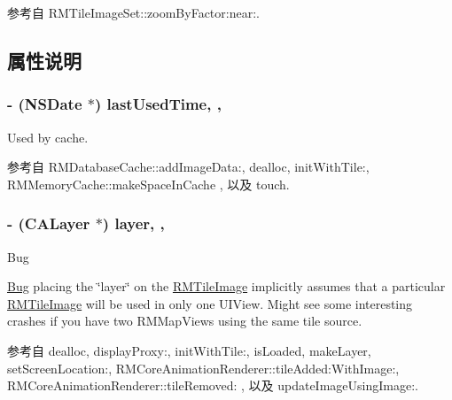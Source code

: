 参考自 R\-M\-Tile\-Image\-Set\-::zoom\-By\-Factor\-:near\-:.



\subsection{属性说明}
\hypertarget{interface_r_m_tile_image_a31ac5bae990405b6e665cfd3dd9e54c8}{
\subsubsection[{last\-Used\-Time}]{\setlength{\rightskip}{0pt plus 5cm}-\/ (N\-S\-Date $\ast$) last\-Used\-Time\hspace{0.3cm}{\ttfamily [read]}, {\ttfamily [atomic]}, {\ttfamily [assign]}}}\label{interface_r_m_tile_image_a31ac5bae990405b6e665cfd3dd9e54c8}


Used by cache. 



参考自 R\-M\-Database\-Cache\-::add\-Image\-Data\-:, dealloc, init\-With\-Tile\-:, R\-M\-Memory\-Cache\-::make\-Space\-In\-Cache , 以及 touch.

\hypertarget{interface_r_m_tile_image_aa83652d7c55218b6fae37c70280cca18}{
\subsubsection[{layer}]{\setlength{\rightskip}{0pt plus 5cm}-\/ (C\-A\-Layer $\ast$) layer\hspace{0.3cm}{\ttfamily [read]}, {\ttfamily [atomic]}, {\ttfamily [assign]}}}\label{interface_r_m_tile_image_aa83652d7c55218b6fae37c70280cca18}
\begin{DoxyRefDesc}{Bug}
\item[\hyperlink{bug__bug000050}{Bug}]placing the \char`\"{}layer\char`\"{} on the \hyperlink{interface_r_m_tile_image}{R\-M\-Tile\-Image} implicitly assumes that a particular \hyperlink{interface_r_m_tile_image}{R\-M\-Tile\-Image} will be used in only one U\-I\-View. Might see some interesting crashes if you have two R\-M\-Map\-Views using the same tile source. \end{DoxyRefDesc}


参考自 dealloc, display\-Proxy\-:, init\-With\-Tile\-:, is\-Loaded, make\-Layer, set\-Screen\-Location\-:, R\-M\-Core\-Animation\-Renderer\-::tile\-Added\-:\-With\-Image\-:, R\-M\-Core\-Animation\-Renderer\-::tile\-Removed\-: , 以及 update\-Image\-Using\-Image\-:.

